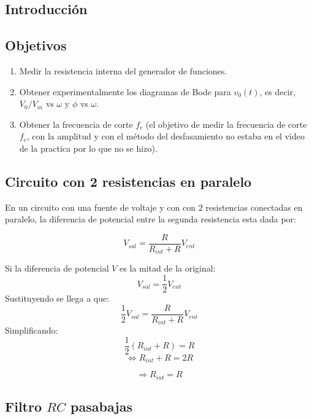 \documentclass[DIV=calc, paper=a4, fontsize=11pt]{scrartcl}
\begin{document}
\begin{multicols}{2}




\section*{Introducción}

\subsection*{Objetivos}



\begin{enumerate}
    \item Medir la resistencia interna del generador de funciones.

    \item Obtener experimentalmente los diagramas de Bode para $v_0 (t)$, es decir,$V_0 /V_m$ vs $\omega$ y $\phi$ vs $\omega$.
    
    \item Obtener la frecuencia de corte $f_c$ (el objetivo de medir la frecuencia de corte $f_c$, con la amplitud y con el método del desfasamiento no estaba en el video de la practica por lo que no se hizo).
    
    
\end{enumerate}



\subsection*{Circuito con 2 resistencias en paralelo}
En un circuito con una fuente de voltaje y con con $2$ resistencias conectadas en paralelo, la diferencia de potencial entre la segunda resistencia esta dada por:

\begin{equation}
  V_{sal}=\frac{R}{R_{int}+R}V_{ent}  
\end{equation}

Si la diferencia de potencial $V$ es la mitad de la original:
$$V_{sal}=\frac{1}{2}V_{ent}$$
Sustituyendo se llega a que:
$$\frac{1}{2}V_{sal}=\frac{R}{R_{int}+R}V_{ent}$$
Simplificando:
$$\frac{1}{2}(R_{int}+R)=R$$
$$\iff R_{int}+R=2R$$

\begin{equation}
  \Rightarrow R_{int}=R  
\end{equation}

\subsection*{Filtro $RC$ pasabajas}


\end{multicols}
\end{document}
